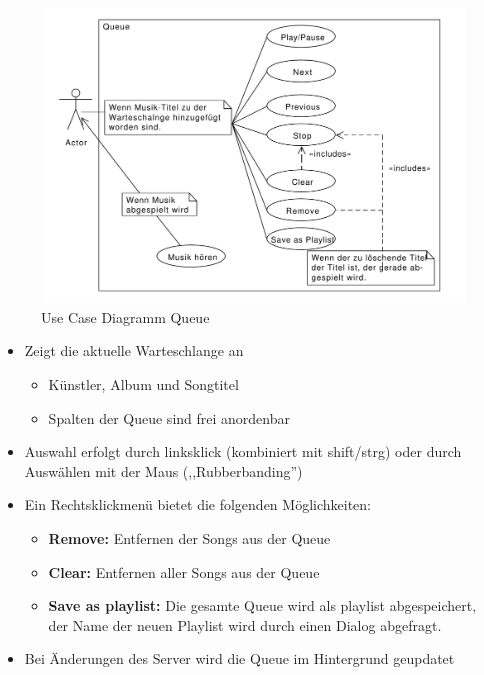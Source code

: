 \begin{figure}[htb!]
    \centering
    \includegraphics[width=\textwidth]{./gfx/usec/queue}
    \caption{Use Case Diagramm Queue}
    \label{uc_queue}
\end{figure}

\begin{itemize}
    \item Zeigt die aktuelle Warteschlange an
        \begin{itemize}
            \item Künstler, Album und Songtitel 
            \item Spalten der Queue sind frei anordenbar
        \end{itemize}
    \item Auswahl erfolgt durch linksklick (kombiniert mit shift/strg) oder durch Auswählen mit der Maus (,,Rubberbanding'')
    \item Ein Rechtsklickmenü bietet die folgenden Möglichkeiten:
        \begin{itemize}
            \item \textbf{Remove:} Entfernen der Songs aus der Queue
            \item \textbf{Clear:} Entfernen aller Songs aus der Queue
            \item \textbf{Save as playlist:} Die gesamte Queue wird als playlist abgespeichert, \\
                der Name der neuen Playlist wird durch einen Dialog abgefragt.
        \end{itemize}
    \item Bei Änderungen des Server wird die Queue im Hintergrund geupdatet
\end{itemize}

